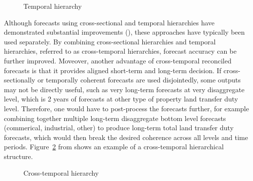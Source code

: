 \documentclass[
  11pt,
  a4paper,
]{article}
\begin{document}
\begin{figure}


\caption{\label{fig-temp}Temporal hierarchy}

\end{figure}%

Although forecasts using cross-sectional and temporal hierarchies have
demonstrated substantial improvements (\textcite{kourentzes2019cross}),
these approaches have typically been used separately. By combining
cross-sectional hierarchies and temporal hierarchies, referred to as
cross-temporal hierarchies, forecast accuracy can be further improved.
Moveover, another advantage of cross-temporal reconciled forecasts is
that it provides aligned short-term and long-term decision. If
cross-sectionally or temporally coherent forecasts are used
disjointedly, some outputs may not be directly useful, such as very
long-term forecasts at very disaggregate level, which is 2 years of
forecasts at other type of property land transfer duty level. Therefore,
one would have to post-process the forecasts further, for example
combining together multiple long-term disaggregate bottom level
forecasts (commerical, industrial, other) to produce long-term total
land transfer duty forecasts, which would then break the desired
coherence across all levels and time periods. Figure~\ref{fig-crosstemp}
from \textcite{kourentzes2019cross} shows an example of a cross-temporal
hierarchical structure.

\begin{figure}


\caption{\label{fig-crosstemp}Cross-temporal hierarchy}

\end{figure}%
\end{document}
